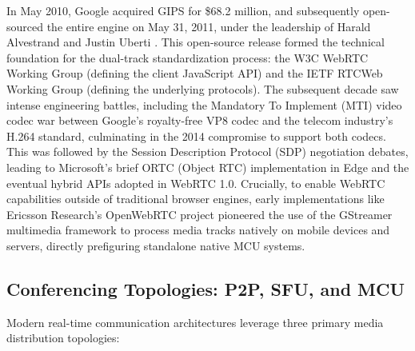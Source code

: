 \documentclass{article}
\begin{document}
In May 2010, Google acquired GIPS for \$68.2 million, and subsequently open-sourced the entire engine
on May 31, 2011, under the leadership of Harald Alvestrand and Justin Uberti \cite{seanslabwebrtc}.
This open-source release formed the technical foundation for the dual-track standardization process:
the W3C WebRTC Working Group (defining the client JavaScript API) and the IETF RTCWeb Working Group
(defining the underlying protocols). The subsequent decade saw intense engineering battles, including
the Mandatory To Implement (MTI) video codec war between Google's royalty-free VP8 codec and the
telecom industry's H.264 standard, culminating in the 2014 compromise to support both codecs.
This was followed by the Session Description Protocol (SDP) negotiation debates, leading to
Microsoft's brief ORTC (Object RTC) implementation in Edge and the eventual hybrid APIs adopted
in WebRTC 1.0. Crucially, to enable WebRTC capabilities outside of traditional browser engines,
early implementations like Ericsson Research's OpenWebRTC project \cite{openwebrtc} pioneered
the use of the GStreamer multimedia framework to process media tracks natively on mobile devices
and servers, directly prefiguring standalone native MCU systems.

\newpage
\subsection{Conferencing Topologies: P2P, SFU, and MCU}

Modern real-time communication architectures leverage three primary media distribution topologies:
\end{document}
